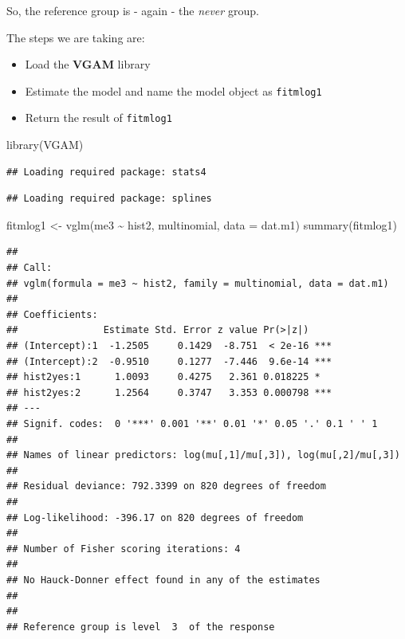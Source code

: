 \documentclass[
  10pt,
]{krantz}
\newenvironment{Shaded}{\begin{snugshade}}{\end{snugshade}}
\newcommand{\AttributeTok}[1]{\textcolor[rgb]{0.77,0.63,0.00}{#1}}
\newcommand{\FunctionTok}[1]{\textcolor[rgb]{0.00,0.00,0.00}{#1}}
\newcommand{\NormalTok}[1]{#1}
\newcommand{\OtherTok}[1]{\textcolor[rgb]{0.56,0.35,0.01}{#1}}
\newcommand{\SpecialCharTok}[1]{\textcolor[rgb]{0.00,0.00,0.00}{#1}}
\providecommand{\tightlist}{%
  \setlength{\itemsep}{0pt}\setlength{\parskip}{0pt}}
\begin{document}
So, the reference group is - again - the \emph{never} group.

The steps we are taking are:

\begin{itemize}
\tightlist
\item
  Load the \textbf{VGAM} library
\item
  Estimate the model and name the model object as \texttt{fitmlog1}
\item
  Return the result of \texttt{fitmlog1}
\end{itemize}

\begin{Shaded}
\begin{Highlighting}[]
\FunctionTok{library}\NormalTok{(VGAM)}
\end{Highlighting}
\end{Shaded}

\begin{verbatim}
## Loading required package: stats4
\end{verbatim}

\begin{verbatim}
## Loading required package: splines
\end{verbatim}

\begin{Shaded}
\begin{Highlighting}[]
\NormalTok{fitmlog1 }\OtherTok{\textless{}{-}} \FunctionTok{vglm}\NormalTok{(me3 }\SpecialCharTok{\textasciitilde{}}\NormalTok{ hist2, multinomial, }\AttributeTok{data =}\NormalTok{ dat.m1)}
\FunctionTok{summary}\NormalTok{(fitmlog1)}
\end{Highlighting}
\end{Shaded}

\begin{verbatim}
## 
## Call:
## vglm(formula = me3 ~ hist2, family = multinomial, data = dat.m1)
## 
## Coefficients: 
##               Estimate Std. Error z value Pr(>|z|)    
## (Intercept):1  -1.2505     0.1429  -8.751  < 2e-16 ***
## (Intercept):2  -0.9510     0.1277  -7.446  9.6e-14 ***
## hist2yes:1      1.0093     0.4275   2.361 0.018225 *  
## hist2yes:2      1.2564     0.3747   3.353 0.000798 ***
## ---
## Signif. codes:  0 '***' 0.001 '**' 0.01 '*' 0.05 '.' 0.1 ' ' 1
## 
## Names of linear predictors: log(mu[,1]/mu[,3]), log(mu[,2]/mu[,3])
## 
## Residual deviance: 792.3399 on 820 degrees of freedom
## 
## Log-likelihood: -396.17 on 820 degrees of freedom
## 
## Number of Fisher scoring iterations: 4 
## 
## No Hauck-Donner effect found in any of the estimates
## 
## 
## Reference group is level  3  of the response
\end{verbatim}
\end{document}
